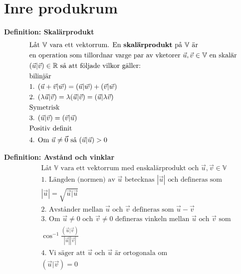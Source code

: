 \section{Inre produkrum}
\textbf{Definition: Skalärprodukt}
\begin{align*}
  &\quad  \text{Låt $\mathbb{V}$ vara ett vektorrum. En \textbf{skalärprodukt} på $\mathbb{V}$ är} \\
  &\quad  \text{en operation som tillordnar varge par av vketorer $\vec{u},\vec{v}\in\mathbb{V}$ en skalär} \\
  &\quad  \text{$(\vec{u}|\vec{v})\in\mathbb{R}$ så att följade vilkor gäller:} \\
  &\quad  \text{bilinjär} \\
  &\quad  \text{1. }  (\vec{u} + \vec{v}|\vec{w}) = (\vec{u}|\vec{w}) + (\vec{v}|\vec{w}) \\
  &\quad  \text{2. }  (\lambda\vec{u}|\vec{v}) = \lambda(\vec{u}|\vec{v}) = (\vec{u}|\lambda\vec{v}) \\
  &\quad  \text{Symetrisk} \\
  &\quad  \text{3. }  (\vec{u}|\vec{v}) = (\vec{v}|\vec{u}) \\
  &\quad  \text{Positiv definit} \\
  &\quad  \text{4. Om } \vec{u}\neq\vec{0} \text{ så } (\vec{u}|\vec{u}) > 0 \\
\end{align*}

\textbf{Definition: Avstånd och vinklar}
\begin{align*}
  &\quad  \text{Låt $\mathbb{V}$ vara ett vektorrum med enskalärprodukt och $\vec{u},\vec{v}\in\mathbb{V}$} \\
  &\quad  \text{1. Längden (normen) av $\vec{u}$ betecknas $|\vec{u}|$ och defineras som} \\
  &\quad  |\vec{u}|=\sqrt{\vec{u}|\vec{u}} \\
  &\quad  \text{2. Avstånder mellan $\vec{u}$ och $\vec{v}$ defineras som $\vec{u}-\vec{v}$}  \\
  &\quad  \text{3. Om $\vec{u}\neq{0}$ och $\vec{v}\neq{0}$ defineras vinkeln mellan
    $\vec{u}$ och $\vec{v}$ som}  \\
  &\quad  \cos^{-1}\frac{(\vec{u}|\vec{v})}{|\vec{u}||\vec{v}|} \\
  &\quad  \text{4. Vi säger att $\vec{u}$ och $\vec{u}$ är ortogonala om } \\
  &\quad  (\vec{u}|\vec{v})=0 \\
\end{align*}

